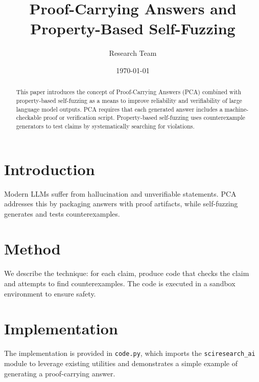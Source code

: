 \documentclass{article}
\title{Proof-Carrying Answers and Property-Based Self-Fuzzing}
\author{Research Team}
\date{\today}
\begin{document}
\maketitle

\begin{abstract}
This paper introduces the concept of Proof-Carrying Answers (PCA) combined with
property-based self-fuzzing as a means to improve reliability and verifiability
of large language model outputs. PCA requires that each generated answer
includes a machine-checkable proof or verification script. Property-based
self-fuzzing uses counterexample generators to test claims by systematically
searching for violations.
\end{abstract}

\section{Introduction}
Modern LLMs suffer from hallucination and unverifiable statements. PCA
addresses this by packaging answers with proof artifacts, while self-fuzzing
generates and tests counterexamples.

\section{Method}
We describe the technique: for each claim, produce code that checks the claim
and attempts to find counterexamples. The code is executed in a sandbox
environment to ensure safety.

\section{Implementation}
The implementation is provided in \texttt{code.py}, which imports the
\texttt{sciresearch\_ai} module to leverage existing utilities and demonstrates
a simple example of generating a proof-carrying answer.
\end{document}
